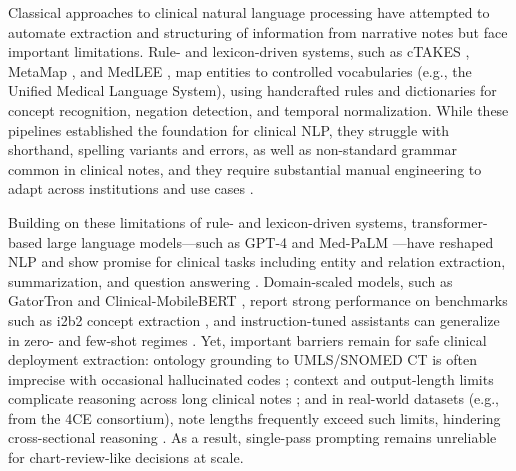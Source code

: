 Classical approaches to clinical natural language processing have attempted to automate extraction and structuring of information from narrative notes but face important limitations. Rule- and lexicon-driven systems, such as cTAKES \cite{Savova_2010}, MetaMap \cite{Aronson2001MetaMap}, and MedLEE \cite{Friedman_1995}, map entities to controlled vocabularies (e.g., the Unified Medical Language System), using handcrafted rules and dictionaries for concept recognition, negation detection, and temporal normalization. While these pipelines established the foundation for clinical NLP, they struggle with shorthand, spelling variants and errors, as well as non-standard grammar common in clinical notes, and they require substantial manual engineering to adapt across institutions and use cases \cite{Tayefi_2021,Pathak_2013}. 

Building on these limitations of rule- and lexicon-driven systems, transformer-based large language models—such as GPT-4 \cite{https://doi.org/10.48550/arxiv.2303.08774} and Med-PaLM \cite{Singhal_2023}—have reshaped NLP and show promise for clinical tasks including entity and relation extraction, summarization, and question answering \cite{https://doi.org/10.48550/arxiv.2005.14165}. Domain-scaled models, such as GatorTron \cite{https://doi.org/10.48550/arxiv.2203.03540} and Clinical-MobileBERT \cite{Rohanian_2023,Rohanian_2024}, report strong performance on benchmarks such as i2b2 concept extraction , and instruction-tuned assistants can generalize in zero- and few-shot regimes \cite{Radford2018Improving}. Yet, important barriers remain for safe clinical deployment extraction: ontology grounding to UMLS/SNOMED CT is often imprecise with occasional hallucinated codes \cite{Karabacak_2023,https://doi.org/10.48550/arxiv.2309.05922}; context and output-length limits complicate reasoning across long clinical notes \cite{https://doi.org/10.48550/arxiv.2303.18223,https://doi.org/10.48550/arxiv.2407.21783}; and in real-world datasets (e.g., from the 4CE consortium), note lengths frequently exceed such limits, hindering cross-sectional reasoning \cite{Brat_2020}. As a result, single-pass prompting remains unreliable for chart-review-like decisions at scale.

